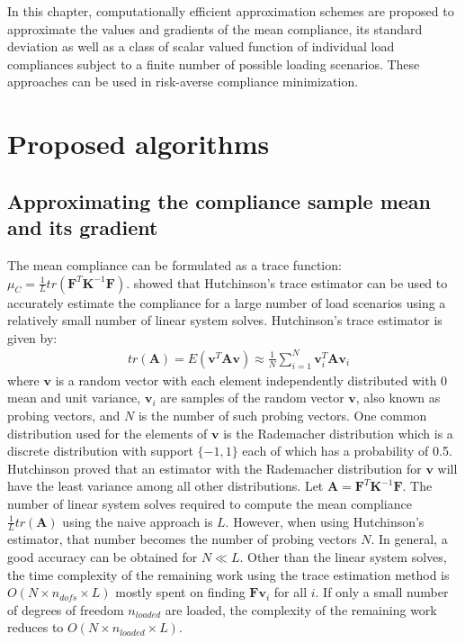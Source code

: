 In this chapter, computationally efficient approximation schemes are proposed to approximate the values and gradients of the mean compliance, its standard deviation as well as a class of scalar valued function of individual load compliances subject to a finite number of possible loading scenarios. These approaches can be used in risk-averse compliance minimization.

\section{Proposed algorithms}

  \subsection{Approximating the compliance sample mean and its gradient} \label{sec:proposed_mean}

    The mean compliance can be formulated as a trace function: $\mu_C = \frac{1}{L} tr(\bm{F}^T \bm{K}^{-1} \bm{F})$. \cite{Zhang2017a} showed that Hutchinson's trace estimator \cite{Hutchinson1990} can be used to accurately estimate the compliance for a large number of load scenarios using a relatively small number of linear system solves. Hutchinson's trace estimator is given by:
      \begin{align}
        & tr(\bm{A}) = E(\bm{v}^T \bm{A} \bm{v}) \approx \frac{1}{N} \sum_{i=1}^{N} \bm{v}_i^T \bm{A} \bm{v}_i
      \end{align}
      where $\bm{v}$ is a random vector with each element independently distributed with 0 mean and unit variance, $\bm{v}_i$ are samples of the random vector $\bm{v}$, also known as probing vectors, and $N$ is the number of such probing vectors. One common distribution used for the elements of $\bm{v}$ is the Rademacher distribution which is a discrete distribution with support $\{-1, 1\}$ each of which has a probability of 0.5. Hutchinson proved that an estimator with the Rademacher distribution for $\bm{v}$ will have the least variance among all other distributions. Let $\bm{A} = \bm{F}^T \bm{K}^{-1} \bm{F}$. The number of linear system solves required to compute the mean compliance $\frac{1}{L} tr(\bm{A})$ using the naive approach is $L$. However, when using Hutchinson's estimator, that number becomes the number of probing vectors $N$. In general, a good accuracy can be obtained for $N \ll L$. Other than the linear system solves, the time complexity of the remaining work using the trace estimation method is $O(N \times n_{dofs} \times L)$ mostly spent on finding $\bm{F} \bm{v}_i$ for all $i$. If only a small number of degrees of freedom $n_{loaded}$ are loaded, the complexity of the remaining work reduces to $O(N \times n_{loaded} \times L)$.

